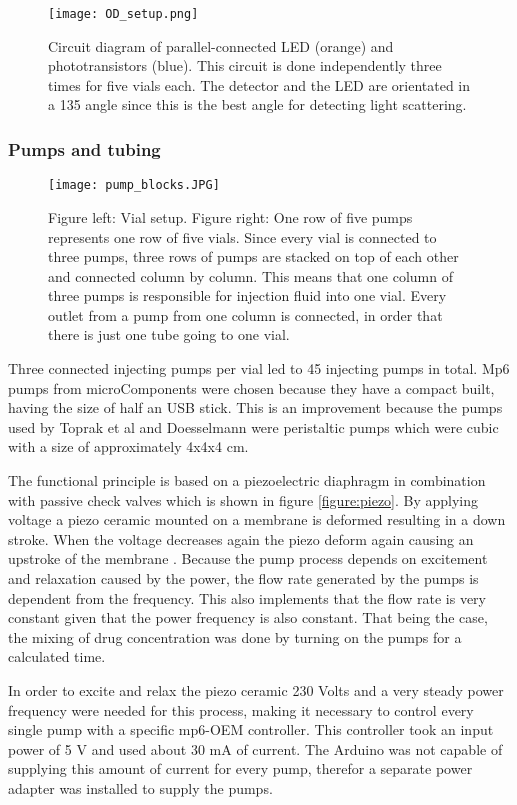 \begin{figure}
	\texttt{[image: OD\_setup.png]}
	\caption{Circuit diagram of parallel-connected LED (orange) and phototransistors (blue). This circuit is done independently three times for five vials each. The detector and the LED are orientated in a 135 \degree  angle since this is the best angle for detecting light scattering.}
	\label{figure:OD_cirguit}
\end{figure}

\subsubsection{Pumps and tubing} 
\begin{figure}
	\texttt{[image: pump\_blocks.JPG]}
	\caption{Figure left: Vial setup. Figure right: One row of five pumps represents one row of five vials. Since every vial is connected to three pumps, three rows of pumps are stacked on top of each other and connected column by column. This means that one column of three pumps is responsible for injection fluid into one vial. Every outlet from a pump from one column is connected, in order that there is just one tube going to one vial. }
	\label{figure:tubing_setup}
\end{figure}
Three connected injecting pumps per vial led to 45 injecting pumps in total. Mp6 pumps from microComponents were chosen because they have a compact built, having the size of half an USB stick. This is an improvement because the pumps used by Toprak et al \cite{toprak_building_2013} and Doesselmann \cite{doselmann_rapid_2017} were peristaltic pumps which were cubic with a size of approximately 4x4x4 cm. 

The functional principle is based on a piezoelectric diaphragm in combination with passive check valves which is shown in figure \ref{figure:piezo}. By applying voltage a piezo ceramic mounted on a membrane is deformed resulting in a down stroke. When the voltage decreases again the piezo deform again causing an upstroke of the membrane \cite{piezo_pumps}. Because the pump process depends on excitement and relaxation caused by the power, the flow rate generated by the pumps is dependent from the frequency. This also implements that the flow rate is very constant given that the power frequency is also constant. That being the case, the mixing of drug concentration was done by turning on the pumps for a calculated time.

In order to excite and relax the piezo ceramic 230 Volts and a very steady power frequency were needed for this process, making it necessary to control every single pump with a specific mp6-OEM controller. This controller took an input power of 5 V and used about 30 mA of current. The Arduino was not capable of supplying this amount of current for every pump, therefor a separate power adapter was installed to supply the pumps. 

